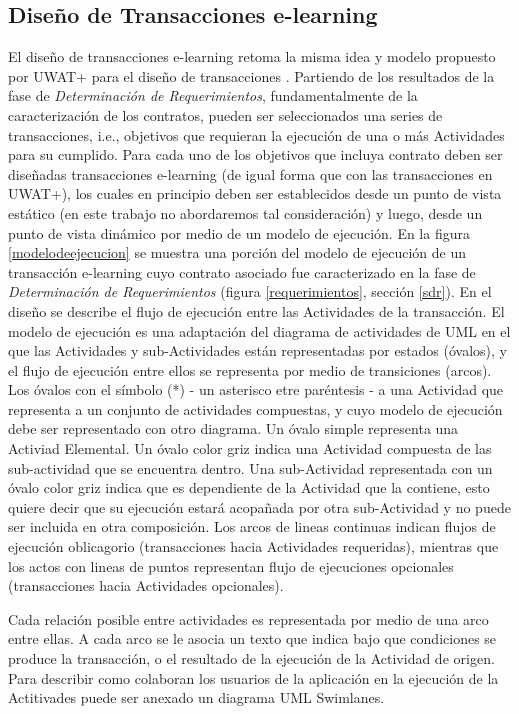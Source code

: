 \documentclass[12 pt,a4paper]{llncs}
\begin{document}
\subsection{Diseño de Transacciones e-learning}

El diseño de transacciones e-learning retoma la misma idea y modelo propuesto por UWAT+ para el diseño de transacciones \cite{UWAT}. Partiendo de los resultados de la fase de \textit{Determinación de Requerimientos}, fundamentalmente de la caracterización de los contratos, pueden ser seleccionados una series de transacciones, i.e., objetivos que requieran la ejecución de una o más Actividades para su cumplido. Para cada uno de los objetivos que incluya contrato deben ser diseñadas transacciones e-learning (de igual forma que con las transacciones en UWAT+), los cuales en principio deben ser establecidos desde un punto de vista estático (en este trabajo no abordaremos tal consideración) y luego, desde un punto de vista dinámico por medio de un modelo de ejecución. En la figura \ref{modelodeejecucion} se muestra una porción del modelo de ejecución de un transacción e-learning cuyo contrato asociado fue caracterizado en la fase de \textit{Determinación de Requerimientos} (figura \ref{requerimientos}, sección \ref{sdr}). En el diseño se describe el flujo de ejecución entre las Actividades de la transacción. El modelo de ejecución es una adaptación del diagrama de actividades de UML \cite{7} en el que las Actividades y sub-Actividades están representadas por estados (óvalos), y el flujo de ejecución entre ellos se representa por medio de transiciones (arcos). Los óvalos con el símbolo (*) - un asterisco etre paréntesis - a una Actividad que representa a un conjunto de actividades compuestas, y cuyo modelo de ejecución debe ser representado con otro diagrama. Un óvalo simple representa una Activiad Elemental. Un óvalo color griz indica una Actividad compuesta de las sub-actividad que se encuentra dentro. Una sub-Actividad representada con un óvalo color griz indica que es dependiente de la Actividad que la contiene, esto quiere decir que su ejecución estará acopañada por otra sub-Actividad y no puede ser incluida en otra composición. Los arcos de lineas continuas indican flujos de ejecución oblicagorio (transacciones hacia Actividades requeridas), mientras que los actos con lineas de puntos representan flujo de ejecuciones opcionales  (transacciones hacia Actividades opcionales).
 
Cada relación posible entre actividades es representada por medio de una arco entre ellas. A cada arco se le asocia un texto que indica bajo que condiciones se produce la transacción, o el resultado de la ejecución de la Actividad de origen. Para describir como colaboran los usuarios de la aplicación en la ejecución de la Actitivades puede ser anexado un diagrama UML Swimlanes. 
\end{document}
